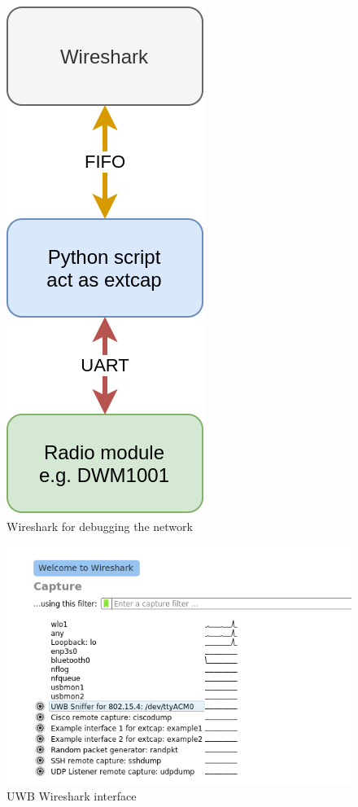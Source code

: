 \documentclass[\main/main.tex]{subfiles}
\begin{document}
\begin{figure}[H]
    \begin{center}
        \includegraphics[scale=0.4]{extcap_802_15_4.png}
    \end{center}
    \caption{Wireshark for debugging the network}
    \label{fig:extcap_802_15_4}
\end{figure}

\begin{figure}[H]
    \begin{center}
        \includegraphics[scale=0.6]{wireshark_interface.png}
    \end{center}
    \caption{UWB Wireshark interface}
    \label{fig:wireshark_interface}
\end{figure}
\end{document}
